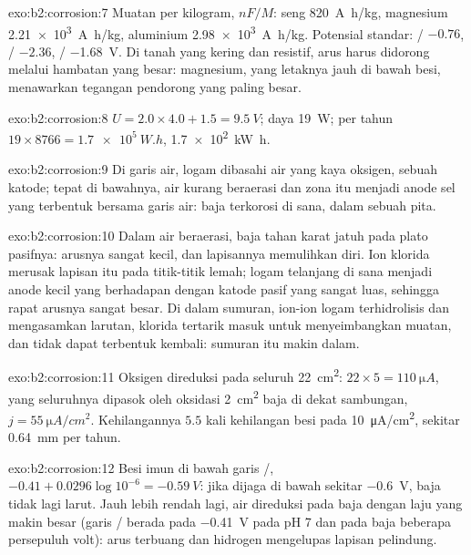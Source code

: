 \begin{solution}{exo:b2:corrosion:7}
Muatan per kilogram, $nF/M$: seng \qty{820}{A.h/kg}, magnesium
\qty{2.21e3}{A.h/kg}, aluminium \qty{2.98e3}{A.h/kg}. Potensial standar:
/ $-0.76$, / $-2.36$, /
\qty{-1.68}{V}. Di tanah yang kering dan resistif, arus harus didorong
melalui hambatan yang besar: magnesium, yang letaknya jauh di bawah besi,
menawarkan tegangan pendorong yang paling besar.
\end{solution}

\begin{solution}{exo:b2:corrosion:8}
$U = 2.0 \times 4.0 + 1.5 = \qty{9.5}{V}$; daya \qty{19}{W}; per tahun $19 \times
8766 = \qty{1.7e5}{W.h}$, \qty{1.7e2}{kW.h}.
\end{solution}

\begin{solution}{exo:b2:corrosion:9}
Di garis air, logam dibasahi air yang kaya oksigen, sebuah katode; tepat di
bawahnya, air kurang beraerasi dan zona itu menjadi anode sel yang
terbentuk bersama garis air: baja terkorosi di sana, dalam sebuah pita.
\end{solution}

\begin{solution}{exo:b2:corrosion:10}
Dalam air beraerasi,  baja tahan karat jatuh pada plato
pasifnya: arusnya sangat kecil, dan lapisannya memulihkan diri. Ion klorida
merusak lapisan itu pada titik-titik lemah; logam telanjang di sana
menjadi anode kecil yang berhadapan dengan katode pasif yang sangat luas,
sehingga rapat arusnya sangat besar. Di dalam sumuran, ion-ion logam
terhidrolisis dan mengasamkan larutan, klorida tertarik masuk untuk
menyeimbangkan muatan, dan  tidak dapat terbentuk kembali:
sumuran itu makin dalam.
\end{solution}

\begin{solution}{exo:b2:corrosion:11}
Oksigen direduksi pada seluruh \qty{22}{cm^2}:  $22 \times 5 =
\qty{110}{\micro A}$, yang seluruhnya dipasok oleh oksidasi \qty{2}{cm^2}
baja di dekat sambungan, $j = \qty{55}{\micro A/cm^2}$. Kehilangannya $5.5$
kali kehilangan besi pada \qty{10}{\micro A/cm^2}, sekitar \qty{0.64}{mm}
per tahun.
\end{solution}

\begin{solution}{exo:b2:corrosion:12}
Besi imun di bawah garis /, $-0.41 + 0.0296\log 10^{-6} =
\qty{-0.59}{V}$: jika dijaga di bawah sekitar \qty{-0.6}{V}, baja tidak lagi
larut. Jauh lebih rendah lagi, air direduksi pada baja dengan laju yang
makin besar (garis / berada pada \qty{-0.41}{V} pada pH 7 dan
 pada baja beberapa persepuluh volt): arus terbuang dan
hidrogen mengelupas lapisan pelindung.
\end{solution}

